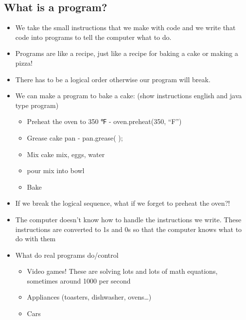 \documentclass[12pt]{article}
\begin{document}
\subsection*{What is a program?}
	\begin{itemize}
		\item We take the small instructions that we make with code and we write that code into programs to tell the computer what to do.
		\item Programs are like a recipe, just like a recipe for baking a cake or making a pizza!
		\item There has to be a logical order otherwise our program will break. 
		\item We can make a program to bake a cake:  (show instructions english and java type program)
		\begin{itemize}
			\item Preheat the oven to 350 ℉  - oven.preheat(350, “F”)
			\item Grease cake pan - pan.grease( );
			\item Mix cake mix, eggs, water
			\item pour mix into bowl
			\item Bake
		\end{itemize}
		\item If we break the logical sequence, what if we forget to preheat the oven?!
		\item The computer doesn't know how to handle the instructions we write.  These instructions are converted to 1s and 0s so that the computer knows what to do with them
		\item What do real programs do/control
		\begin{itemize}
			\item Video games! These are solving lots and lots of math equations, sometimes around 1000 per second
			\item Appliances (toasters, dishwasher, ovens…)
			\item Cars
		\end{itemize}
	\end{itemize}
\end{document}
